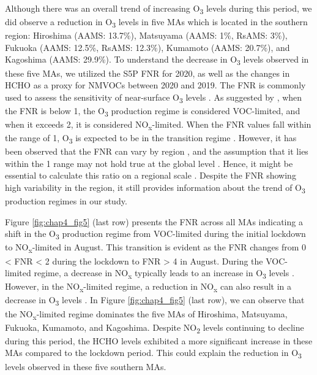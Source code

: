 Although there was an overall trend of increasing O\textsubscript{3} levels during this period, we did observe a reduction in O\textsubscript{3} levels in five MAs which is located in the southern region: Hiroshima (AAMS: 13.7\%), Matsuyama (AAMS: 1\%, RsAMS: 3\%), Fukuoka (AAMS: 12.5\%, RsAMS: 12.3\%), Kumamoto (AAMS: 20.7\%), and Kagoshima (AAMS: 29.9\%). To understand the decrease in O\textsubscript{3} levels observed in these five MAs, we utilized the S5P FNR for 2020, as well as the changes in HCHO as a proxy for NMVOCs between 2020 and 2019. The FNR is commonly used to assess the sensitivity of near-surface O\textsubscript{3} levels \citep{martin2004space}. As suggested by \citep{duncan2010application}, when the FNR is below 1, the O\textsubscript{3} production regime is considered VOC-limited, and when it exceeds 2, it is considered NO\textsubscript{x}-limited. When the FNR values fall within the range of 1, O\textsubscript{3} is expected to be in the transition regime \citep{duncan2010application}. However, it has been observed that the FNR can vary by region \citep{jin2020inferring,irie2021continuous,souri2023characterization,ren2022diagnosing}, and the assumption that it lies within the 1 range may not hold true at the global level \citep{schroeder2017new}. Hence, it might be essential to calculate this ratio on a regional scale \citep{damiani2022peculiar,schroeder2017new}. Despite the FNR showing high variability in the region, it still provides information about the trend of O\textsubscript{3} production regimes in our study. \par
Figure \ref{fig:chap4_fig5} (last row) presents the FNR across all MAs indicating a shift in the O\textsubscript{3} production regime from VOC-limited during the initial lockdown to NO\textsubscript{x}-limited in August. This transition is evident as the FNR changes from 0 < FNR < 2 during the lockdown to FNR > 4 in August. During the VOC-limited regime, a decrease in NO\textsubscript{x} typically leads to an increase in O\textsubscript{3} levels \citep{duncan2010application}. However, in the NO\textsubscript{x}-limited regime, a reduction in NO\textsubscript{x} can also result in a decrease in O\textsubscript{3} levels \citep{duncan2010application}. In Figure \ref{fig:chap4_fig5} (last row), we can observe that the NO\textsubscript{x}-limited regime dominates the five MAs of Hiroshima, Matsuyama, Fukuoka, Kumamoto, and Kagoshima. Despite NO\textsubscript{2} levels continuing to decline during this period, the HCHO levels exhibited a more significant increase in these MAs compared to the lockdown period. This could explain the reduction in O\textsubscript{3} levels observed in these five southern MAs. \par
